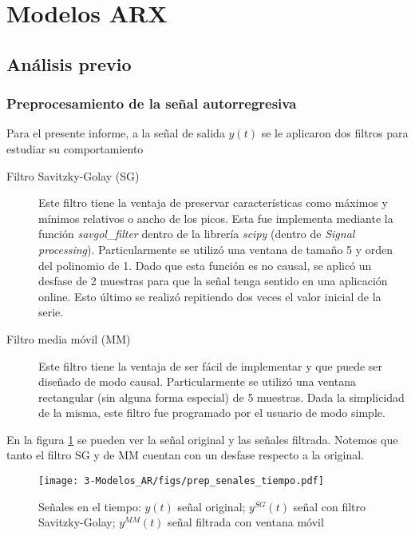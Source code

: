 \section{Modelos ARX}

\subsection{Análisis previo}



\subsubsection*{Preprocesamiento de la señal autorregresiva}

Para el presente informe, a la señal de salida $y(t)$ se le aplicaron dos filtros para estudiar su comportamiento

\begin{description}

\item[Filtro Savitzky-Golay (SG)] Este filtro tiene la ventaja de preservar características como máximos y mínimos relativos o ancho de los picos. Esta fue implementa mediante la función \emph{savgol\_filter} dentro de la librería \emph{scipy} (dentro de \emph{Signal processing}). Particularmente se utilizó una ventana de tamaño 5 y orden del polinomio de 1. Dado que esta función es no causal, se aplicó un desfase de 2 muestras para que la señal tenga sentido en una aplicación online. Esto último se realizó repitiendo dos veces el valor inicial de la serie.

\item[Filtro media móvil (MM)] Este filtro tiene la ventaja de ser fácil de implementar y que puede ser diseñado de modo causal. Particularmente se utilizó una ventana rectangular (sin alguna forma especial) de 5 muestras. Dada la simplicidad de la misma, este filtro fue programado por el usuario de modo simple.

\end{description}


En la figura \ref{fig:y_serie_tiempo} se pueden ver la señal original y las señales filtrada. Notemos que tanto el filtro SG y de MM cuentan con un desfase respecto a la original.

\begin{figure}[H]
	\centering
	\texttt{[image: 3-Modelos\_AR/figs/prep\_senales\_tiempo.pdf]}
	\caption{Señales en el tiempo: $y(t)$ señal original; $y^{SG}(t)$ señal con filtro Savitzky-Golay; $y^{MM}(t)$ señal filtrada con ventana móvil}
	\label{fig:y_serie_tiempo}
\end{figure}

